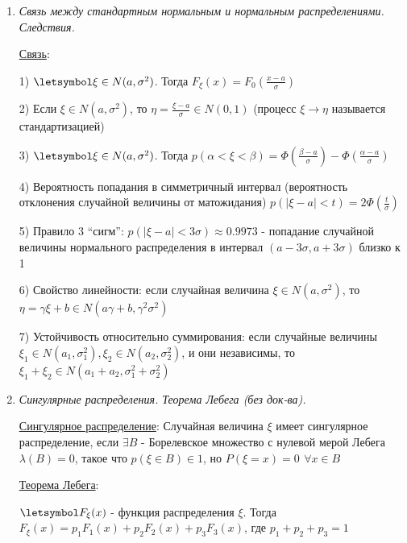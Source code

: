 \documentclass[12pt]{article}
\begin{document}
\begin{enumerate}
    Распределение: $F_0(x) = \frac{1}{\sqrt{2\pi}} \int_{-\infty}^x e^{-\frac{z^2}{2}} dz$ - функция стандартного нормального распределения

    $E\xi = 0; \ D\xi = 1$

    \item \textit{Связь между стандартным нормальным и нормальным распределениями. Следствия.}

    \hyperlink{connectionbetweennormalandstandard}{Связь}: 

    1) $\letsymbol \xi \in N(a, \sigma^2)$. Тогда $F_\xi(x) = F_0\left(\frac{x - a}{\sigma}\right)$

    2) Если $\xi \in N(a, \sigma^2)$, то $\eta = \frac{\xi - a}{\sigma} \in N(0, 1)$ (процесс $\xi \to \eta$ называется стандартизацией)

    3) $\letsymbol \xi \in N(a, \sigma^2)$. Тогда $p(\alpha < \xi < \beta) = \Phi\left(\frac{\beta - a}{\sigma}\right) - \Phi\left(\frac{\alpha - a}{\sigma}\right)$

    4) Вероятность попадания в симметричный интервал (вероятность отклонения случайной величины от матожидания) 
    $p(|\xi - a| < t) = 2\Phi\left(\frac{t}{\sigma}\right)$

    5) Правило 3 \enquote{сигм}: $p(|\xi - a| < 3\sigma) \approx 0.9973$ - попадание случайной величины нормального распределения в интервал $(a - 3\sigma, a + 3\sigma)$ близко к 1

    6) Свойство линейности: если случайная величина $\xi \in N(a, \sigma^2)$, то $\eta = \gamma \xi + b \in N(a \gamma + b, \gamma^2 \sigma^2)$ 
    
    7) Устойчивость относительно суммирования: если случайные величины $\xi_1 \in N(a_1, \sigma_1^2), \xi_2 \in N(a_2, \sigma_2^2)$, и они независимы, то $\xi_1 + \xi_2 \in N(a_1 + a_2, \sigma^2_1 + \sigma^2_2)$

    
    \item \textit{Сингулярные распределения. Теорема Лебега (без док-ва).}

    \hyperlink{singulardistribution}{Сингулярное распределение}: Случайная величина $\xi$ имеет сингулярное распределение, если $\exists B$ - Борелевское множество с нулевой мерой Лебега $\lambda(B) = 0$, такое что $p(\xi \in B) \in 1$, но $P(\xi = x) = 0 \ \, \forall x \in B$

    \hyperlink{lebesguetheorem}{Теорема Лебега}: 

    $\letsymbol F_\xi(x)$ - функция распределения $\xi$. Тогда $F_\xi(x) = p_1 F_1(x) + p_2 F_2(x) + p_3 F_3(x)$, где $p_1 + p_2 + p_3 = 1$


\end{enumerate}
\end{document}
